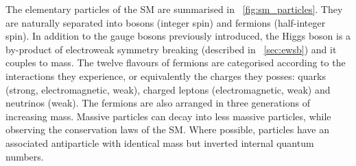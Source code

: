The elementary particles of the \ac{SM} are summarised in \Figure~\ref{fig:sm_particles}.
They are naturally separated into bosons (integer spin) and fermions (half-integer spin).
In addition to the gauge bosons previously introduced, the Higgs boson is a by-product
of electroweak symmetry breaking (described in \Section~\ref{sec:ewsb}) and it couples to 
mass. The twelve flavours of fermions are categorised according to the interactions they 
experience, or equivalently the charges they posses: quarks (strong, electromagnetic, 
weak), charged leptons (electromagnetic, weak) and neutrinos (weak). The fermions are also 
arranged in three generations of increasing mass. Massive particles can decay into less 
massive particles, while observing the conservation laws of the \ac{SM}. Where possible, 
particles have an associated antiparticle with identical mass but inverted internal 
quantum numbers.
